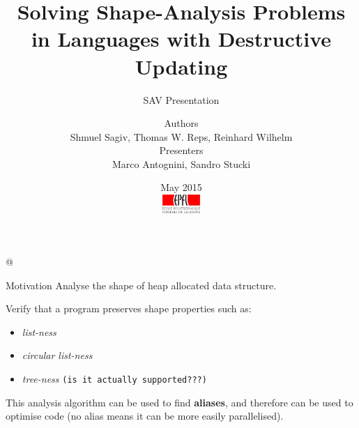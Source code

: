 \documentclass[xcolor={usenames,dvipsnames}]{beamer}
\title{Solving Shape-Analysis Problems in Languages with Destructive Updating}
\subtitle{SAV Presentation}
\author[Sagiv~et~al.]{%
  {\small Authors}\\ \vspace{1ex}
  Shmuel Sagiv, Thomas W. Reps, Reinhard Wilhelm \\
  \vspace{1em}
  {\small Presenters}\\ \vspace{1ex}
  Marco Antognini, Sandro Stucki
}
\date{%
  \vspace{-1em}
  \small May 2015\\[2em]
  \includegraphics[height=7mm]{img/epfl-logo}}
\newcommand{\TODO}[1]{\texttt{\textcolor{YellowOrange}{(#1)}}}
\begin{document}
\begin{frame}
  \titlepage
\end{frame}

\lstMakeShortInline[%
  style=scala-color,%
  flexiblecolumns=false,%
  mathescape=false,%
  basicstyle=\color{blue!30!darkgray}\tt]@




\begin{frame}[fragile]{Motivation}
  Analyse the shape of heap allocated data structure.

  \vspace{1em}
  
  Verify that a program preserves shape properties such as:
  \begin{itemize}
  \item \textit{list-ness}
  \item \textit{circular list-ness}
  \item \textit{tree-ness} \TODO{is it actually supported???}
  \end{itemize}
  
  \vspace{1em}
  
  This analysis algorithm can be used to find \textbf{aliases}, and therefore can be used to optimise code (no alias means it can be more easily parallelised).
\end{frame}
\end{document}
